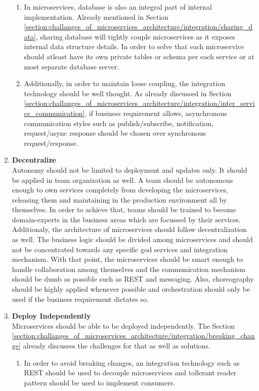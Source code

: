 \begin{enumerate}
\begin{enumerate}
\item In microservices, database is also an integral part of internal implementation. Already mentioned in Section \ref{section:challanges_of_microservices_architecture/integration/sharing_data}, sharing database will tightly couple microservices as it exposes internal data structure details. In order to solve that each microservice should atleast have its own private tables or schema per each service or at most separate database server.
\item Additionally, in order to maintain loose coupling, the integration technology should be well thought. As already discussed in Section \ref{section:challanges_of_microservices_architecture/integration/inter_service_communication}, if business requirement allows, asynchronous communication styles such as publish/subscribe, notification, request/async response should be chosen over synchronous request/response.
\end{enumerate}
\item \textbf{Decentralize} \\
Autonomy should not be limited to deployment and updates only. It should be applied in team organization as well. A team should be autonomous enough to own services completely from developing the microservices, releasing them and maintaining in the production environment all by themselves. In order to achieve that, teams should be trained to become domain-experts in the business areas which are focussed by their services.
Additionaly, the architecture of microservices should follow decentralization as well. The business logic should be divided among microservices and should not be concentrated towards any specific god services and integration mechanism. With that point, the microservices should be smart enough to handle collaboration among themselves and the communication mechanism should be dumb as possible such as \acrshort{REST} and messaging. Also, choreography should be highly applied whenever possible and orchestration should only be used if the business requirement dictates so.
\item \textbf{Deploy Independently}\\
Microservices should be able to be deployed independently. The Section \ref{section:challanges_of_microservices_architecture/integration/breaking_change} already discusses the challenges for that as well as solutions.
\begin{enumerate}
\item In order to avoid breaking changes, an integration technology such as \acrshort{REST} should be used to decouple microservices and tollerant reader pattern should be used to implement consumers.

\end{enumerate}
\end{enumerate}
